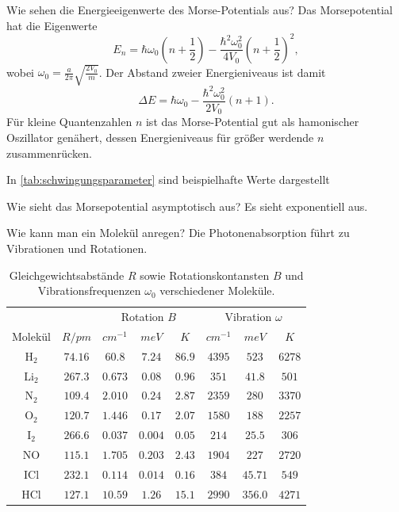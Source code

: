 \begin{fquestion}{Wie sehen die Energieeigenwerte des Morse-Potentials aus?}
    Das Morsepotential hat die Eigenwerte
    $$E_n = \hbar \omega_0 \left(n + \frac{1}{2}\right) - \frac{\hbar^2 \omega_0^2}{4 V_0} \left(n + \frac{1}{2}\right)^2,$$
    wobei $\omega_0 = \frac{a}{2\pi} \sqrt{\frac{2 V_0}{m}}$.
    Der Abstand zweier Energieniveaus ist damit
    $$\Delta E = \hbar \omega_0 - \frac{\hbar^2 \omega_0^2}{2 V_0} (n + 1).$$
    Für kleine Quantenzahlen $n$ ist das Morse-Potential gut als hamonischer Oszillator genähert, dessen Energieniveaus für größer werdende $n$ zusammenrücken.
    
    In \autoref{tab:schwingungsparameter} sind beispielhafte Werte dargestellt
\end{fquestion}

\begin{fquestion}{Wie sieht das Morsepotential asymptotisch aus?}
    Es sieht exponentiell aus.
\end{fquestion}

\begin{fquestion}{Wie kann man ein Molekül anregen?}
    Die Photonenabsorption führt zu Vibrationen und Rotationen.
\end{fquestion}

\begin{table}[htb!]
    \centering
    \begin{tabular}{|c|c|ccc|ccc|}
        \hline
        & & \multicolumn{3}{c|}{Rotation $B$} & \multicolumn{3}{c|}{Vibration $\omega$} \\
        Molekül & $R / \si{pm}$ & $\si{cm^{-1}}$ & $\si{meV}$ & $\si{K}$ & $\si{cm^{-1}}$ & $\si{meV}$ & $\si{K}$ \\
        \hline
        $\text{H}_2$ & $74.16$ & $60.8$ & $7.24$ & $86.9$ & $4395$ & $523$ & $6278$ \\
        $\text{Li}_2$ & $267.3$ & $0.673$ & $0.08$ & $0.96$ & $351$ & $41.8$ & $501$ \\
        $\text{N}_2$ & $109.4$ & $2.010$ & $0.24$ & $2.87$ & $2359$ & $280$ & $3370$ \\
        $\text{O}_2$ & $120.7$ & $1.446$ & $0.17$ & $2.07$ & $1580$ & $188$ & $2257$ \\
        $\text{I}_2$ & $266.6$ & $0.037$ & $0.004$ & $0.05$ & $214$ & $25.5$ & $306$ \\
        \hline
        $\text{NO}$ & $115.1$ & $1.705$ & $0.203$ & $2.43$ & $1904$ & $227$ & $2720$ \\
        $\text{ICl}$ & $232.1$ & $0.114$ & $0.014$ & $0.16$ & $384$ & $45.71$ & $549$ \\
        $\text{HCl}$ & $127.1$ & $10.59$ & $1.26$ & $15.1$ & $2990$ & $356.0$ & $4271$ \\
        \hline
    \end{tabular}
    \caption{Gleichgewichtsabstände $R$ sowie Rotationskontansten $B$ und Vibrationsfrequenzen $\omega_0$ verschiedener Moleküle. }
    \label{tab:schwingungsparameter}
\end{table}

